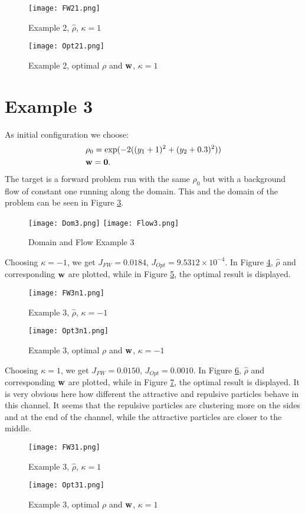 \begin{figure}[h]
	\centering
	\texttt{[image: FW21.png]}
	\caption{Example 2, $\widehat \rho$, $\kappa = 1$} 
	\label{FEx2c}
\end{figure}
\begin{figure}[h]
	\centering
	\texttt{[image: Opt21.png]}
	\caption{Example 2, optimal $\rho$ and $\mathbf{w}$, $\kappa = 1$} 
	\label{FEx2d}
\end{figure}







	
\section*{Example 3}
As initial configuration we choose:
\begin{align*}
&\rho_0 = \exp(-2((y_1 + 1)^2 + (y_2 + 0.3)^2))\\
&\mathbf{w} = \mathbf{0}.
\end{align*}	
The target is a forward problem run with the same $\rho_0$ but with a background flow of constant one running along the domain. This and the domain of the problem can be seen in Figure \ref{Dom3}.
\begin{figure}[h]
	\centering
	\texttt{[image: Dom3.png]}
	\texttt{[image: Flow3.png]}
	\caption{Domain and Flow Example 3} 
	\label{Dom3}
\end{figure}	
	
Choosing $\kappa = -1$, we get $J_{FW} = 0.0184$, $J_{Opt} = 9.5312 \times 10^{-4}$. In Figure \ref{FEx3a}, $\widehat \rho$ and corresponding $\mathbf{w}$ are plotted, while in Figure \ref{FEx3b}, the optimal result is displayed.
\begin{figure}[h]
	\centering
	\texttt{[image: FW3n1.png]}
	\caption{Example 3, $\widehat \rho$, $\kappa = -1$} 
	\label{FEx3a}
\end{figure}
\begin{figure}[h]
	\centering
	\texttt{[image: Opt3n1.png]}
	\caption{Example 3, optimal $\rho$ and $\mathbf{w}$, $\kappa = -1$} 
	\label{FEx3b}
\end{figure}	
	
Choosing $\kappa = 1$, we get $J_{FW} = 0.0150$, $J_{Opt} = 0.0010$. In Figure \ref{FEx3c}, $\widehat \rho$ and corresponding $\mathbf{w}$ are plotted, while in Figure \ref{FEx3d}, the optimal result is displayed. It is very obvious here how different the attractive and repulsive particles behave in this channel. It seems that the repulsive particles are clustering more on the sides and at the end of the channel, while the attractive particles are closer to the middle.
\begin{figure}[h]
	\centering
	\texttt{[image: FW31.png]}
	\caption{Example 3, $\widehat \rho$, $\kappa = 1$} 
	\label{FEx3c}
\end{figure}
\begin{figure}[h]
	\centering
	\texttt{[image: Opt31.png]}
	\caption{Example 3, optimal $\rho$ and $\mathbf{w}$, $\kappa = 1$} 
	\label{FEx3d}
\end{figure}	
	